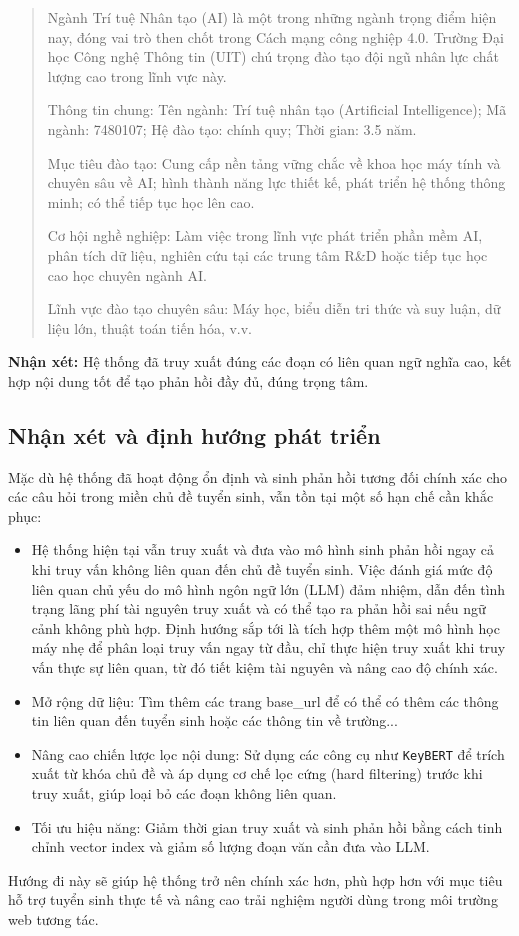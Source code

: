\begin{quote}
    \small
    Ngành Trí tuệ Nhân tạo (AI) là một trong những ngành trọng điểm hiện nay, đóng vai trò then chốt trong Cách mạng công nghiệp 4.0. Trường Đại học Công nghệ Thông tin (UIT) chú trọng đào tạo đội ngũ nhân lực chất lượng cao trong lĩnh vực này.

    Thông tin chung: Tên ngành: Trí tuệ nhân tạo (Artificial Intelligence); Mã ngành: 7480107; Hệ đào tạo: chính quy; Thời gian: 3.5 năm.

    Mục tiêu đào tạo: Cung cấp nền tảng vững chắc về khoa học máy tính và chuyên sâu về AI; hình thành năng lực thiết kế, phát triển hệ thống thông minh; có thể tiếp tục học lên cao.

    Cơ hội nghề nghiệp: Làm việc trong lĩnh vực phát triển phần mềm AI, phân tích dữ liệu, nghiên cứu tại các trung tâm R\&D hoặc tiếp tục học cao học chuyên ngành AI.

    Lĩnh vực đào tạo chuyên sâu: Máy học, biểu diễn tri thức và suy luận, dữ liệu lớn, thuật toán tiến hóa, v.v.
\end{quote}

\textbf{Nhận xét:} Hệ thống đã truy xuất đúng các đoạn có liên quan ngữ nghĩa cao, kết hợp nội dung tốt để tạo phản hồi đầy đủ, đúng trọng tâm.

\subsection{Nhận xét và định hướng phát triển}

Mặc dù hệ thống đã hoạt động ổn định và sinh phản hồi tương đối chính xác cho các câu hỏi trong miền chủ đề tuyển sinh, vẫn tồn tại một số hạn chế cần khắc phục:

\begin{itemize}
    \item Hệ thống hiện tại vẫn truy xuất và đưa vào mô hình sinh phản hồi ngay cả khi truy vấn không liên quan đến chủ đề tuyển sinh. Việc đánh giá mức độ liên quan chủ yếu do mô hình ngôn ngữ lớn (LLM) đảm nhiệm, dẫn đến tình trạng lãng phí tài nguyên truy xuất và có thể tạo ra phản hồi sai nếu ngữ cảnh không phù hợp. Định hướng sắp tới là tích hợp thêm một mô hình học máy nhẹ để phân loại truy vấn ngay từ đầu, chỉ thực hiện truy xuất khi truy vấn thực sự liên quan, từ đó tiết kiệm tài nguyên và nâng cao độ chính xác.

    \item Mở rộng dữ liệu: Tìm thêm các trang base\_url để có thể có thêm các thông tin liên quan đến tuyển sinh hoặc các thông tin về trường...

    \item Nâng cao chiến lược lọc nội dung: Sử dụng các công cụ như \texttt{KeyBERT} để trích xuất từ khóa chủ đề và áp dụng cơ chế lọc cứng (hard filtering) trước khi truy xuất, giúp loại bỏ các đoạn không liên quan.

    \item Tối ưu hiệu năng: Giảm thời gian truy xuất và sinh phản hồi bằng cách tinh chỉnh vector index và giảm số lượng đoạn văn cần đưa vào LLM.
\end{itemize}

Hướng đi này sẽ giúp hệ thống trở nên chính xác hơn, phù hợp hơn với mục tiêu hỗ trợ tuyển sinh thực tế và nâng cao trải nghiệm người dùng trong môi trường web tương tác.
